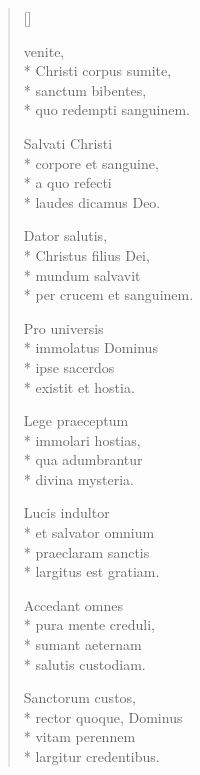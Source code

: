 \newHymn

\settowidth{\versewidth}{Christi corpus sumite}

\pointtrans

\begin{multicols}{2}
\begin{verse}[\versewidth]

 venite,\\*
Christi corpus sumite,\\*
sanctum bibentes,\\*
quo redempti sanguinem.

Salvati Christi\\*
corpore et sanguine,\\*
a quo refecti\\*
laudes dicamus Deo.

Dator salutis,\\*
Christus filius Dei,\\*
mundum salvavit\\*
per crucem et sanguinem.

Pro universis\\*
immolatus Dominus\\*
ipse sacerdos\\*
existit et hostia.

Lege praeceptum\\*
immolari hostias,\\*
qua adumbrantur\\*
divina mysteria.

Lucis indultor\\*
et salvator omnium\\*
praeclaram sanctis\\*
largitus est gratiam.

Accedant omnes\\*
pura mente creduli,\\*
sumant aeternam\\*
salutis custodiam.

Sanctorum custos,\\*
rector quoque, Dominus\\*
vitam perennem\\*
largitur credentibus.

\end{verse}
\end{multicols}

